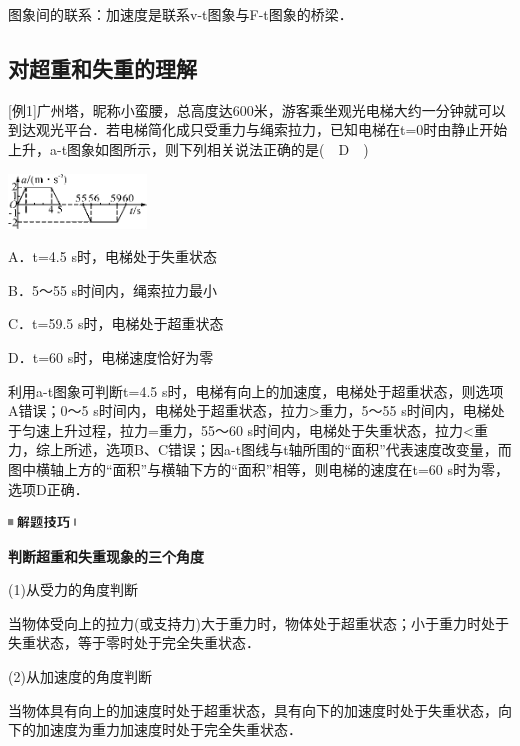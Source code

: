 \documentclass[cn,10.5pt,chinese,mac,chinesefont=founder]{elegantbook}
\begin{document}
图象间的联系：加速度是联系v-t图象与F-t图象的桥梁．

\newpage
\subsection{对超重和失重的理解}

{[}例1{]}广州塔，昵称小蛮腰，总高度达600米，游客乘坐观光电梯大约一分钟就可以到达观光平台．若电梯简化成只受重力与绳索拉力，已知电梯在t=0时由静止开始上升，a-t图象如图所示，则下列相关说法正确的是(　D　)

\begin{center}\includegraphics[width=1.44792in,height=0.57292in]{media/image116.png}\end{center}

A．t=4.5 s时，电梯处于失重状态

B．5～55 s时间内，绳索拉力最小

C．t=59.5 s时，电梯处于超重状态

D．t=60 s时，电梯速度恰好为零
\begin{solution}
	利用a-t图象可判断t=4.5
s时，电梯有向上的加速度，电梯处于超重状态，则选项A错误；0～5
s时间内，电梯处于超重状态，拉力\textgreater 重力，5～55
s时间内，电梯处于匀速上升过程，拉力=重力，55～60
s时间内，电梯处于失重状态，拉力\textless 重力，综上所述，选项B、C错误；因a-t图线与t轴所围的``面积''代表速度改变量，而图中横轴上方的``面积''与横轴下方的``面积''相等，则电梯的速度在t=60
s时为零，选项D正确．
\end{solution}

\begin{center}\includegraphics[width=0.70833in,height=0.125in]{media/image37.png}

\textbf{判断超重和失重现象的三个角度}
\end{center}


(1)从受力的角度判断

当物体受向上的拉力(或支持力)大于重力时，物体处于超重状态；小于重力时处于失重状态，等于零时处于完全失重状态．

(2)从加速度的角度判断

当物体具有向上的加速度时处于超重状态，具有向下的加速度时处于失重状态，向下的加速度为重力加速度时处于完全失重状态．
\end{document}
